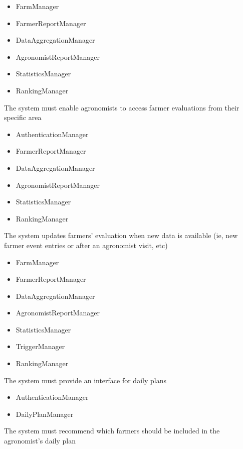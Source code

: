 \begin{itemize}
\begin{itemize}
\item FarmManager
\item FarmerReportManager
\item DataAggregationManager
\item AgronomistReportManager
\item StatisticsManager
\item RankingManager


\end{itemize}
  The system must enable agronomists to access farmer evaluations from their specific area
\begin{itemize}


\item AuthenticationManager
\item FarmerReportManager
\item DataAggregationManager
\item AgronomistReportManager
\item StatisticsManager
\item RankingManager

\end{itemize}

  The system updates farmers' evaluation when new data is available (ie, new farmer event entries or after an agronomist visit, etc)
\begin{itemize}


\item FarmManager
\item FarmerReportManager
\item DataAggregationManager
\item AgronomistReportManager
\item StatisticsManager
\item TriggerManager
\item RankingManager

\end{itemize}

  The system must provide an interface for daily plans
\begin{itemize}


\item AuthenticationManager
\item DailyPlanManager


\end{itemize}

  The system must recommend which farmers should be included in the agronomist's daily plan
\begin{itemize}


\end{itemize}
\end{itemize}
